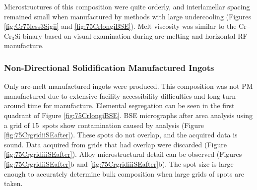Microstructures of this composition were quite orderly, and interlamellar spacing remained small when manufactured by methods with large undercooling (Figures \ref{fig:Cr75less3Sigii} and \ref{fig:75CrlongiBSE}).  Melt viscosity was similar to the Cr--Cr$_3$Si binary based on visual examination during arc-melting and horizontal RF manufacture. 


\subsubsection{Non-Directional Solidification Manufactured Ingots}
Only arc-melt manufactured ingots were produced.  This composition was not PM manufactured due to extensive facility accessibility difficulties and long turn-around time for manufacture.  Elemental segregation can be seen in the first quadrant of Figure \ref{fig:75CrlongiBSE}.  BSE micrographs after area analysis using a grid of 15\micro\metre\ spots show contamination  caused by analysis (Figure \ref{fig:75CrgridiiSEafter}).  These spots do not overlap, and the acquired data is sound.  Data acquired from grids that had overlap were discarded (Figure \ref{fig:75CrgridiiiSEafter}).  Alloy microstructural detail can be observed  (Figures \ref{fig:75CrgridiiSEafter}b and \ref{fig:75CrgridiiiSEafter}b).  The spot size is large enough to accurately determine bulk composition when large grids of spots are taken.

